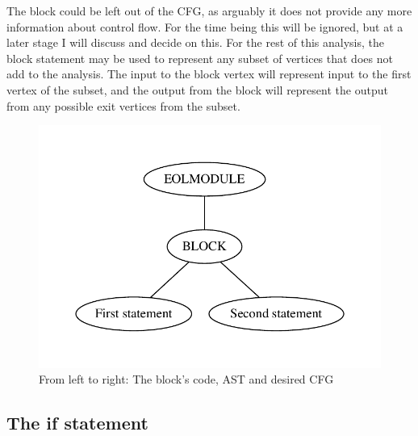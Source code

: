 The block could be left out of the CFG, as arguably it does not provide any more information about control flow. For the time being this will be ignored, but at a later stage I will discuss and decide on this. For the rest of this analysis, the block statement may be used to represent any subset of vertices that does not add to the analysis. The input to the block vertex will represent input to the first vertex of the subset, and the output from the block will represent the output from any possible exit vertices from the subset.

\begin{figure}
\centering
\begin{minipage}{.3\textwidth}
  \centering
  
\end{minipage}%
\begin{minipage}{.3\textwidth}
  \centering
  \includegraphics[width=\linewidth]{figures/statements/block_AST.pdf}
\end{minipage}
\begin{minipage}{.3\textwidth}
  \centering
\end{minipage}
\caption{From left to right: The block's code, AST and desired CFG}
\label{fig:block}
\end{figure}

\subsection{The if statement}

